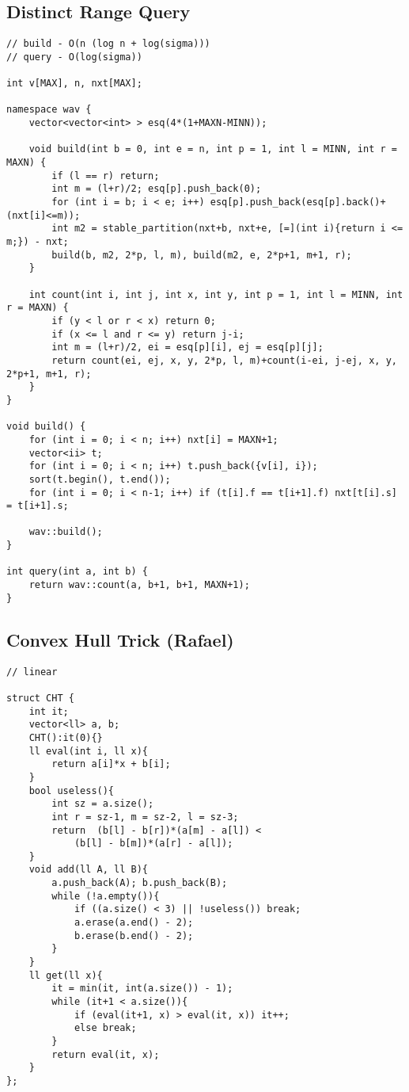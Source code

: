 \documentclass[12pt, a4paper, twoside]{article}
\begin{document}
\subsection{Distinct Range Query}
\begin{lstlisting}
// build - O(n (log n + log(sigma)))
// query - O(log(sigma))

int v[MAX], n, nxt[MAX];

namespace wav {
	vector<vector<int> > esq(4*(1+MAXN-MINN));

	void build(int b = 0, int e = n, int p = 1, int l = MINN, int r = MAXN) {
		if (l == r) return;
		int m = (l+r)/2; esq[p].push_back(0);
		for (int i = b; i < e; i++) esq[p].push_back(esq[p].back()+(nxt[i]<=m));
		int m2 = stable_partition(nxt+b, nxt+e, [=](int i){return i <= m;}) - nxt;
		build(b, m2, 2*p, l, m), build(m2, e, 2*p+1, m+1, r);
	}

	int count(int i, int j, int x, int y, int p = 1, int l = MINN, int r = MAXN) {
		if (y < l or r < x) return 0;
		if (x <= l and r <= y) return j-i;
		int m = (l+r)/2, ei = esq[p][i], ej = esq[p][j];
		return count(ei, ej, x, y, 2*p, l, m)+count(i-ei, j-ej, x, y, 2*p+1, m+1, r);
	}
}

void build() {
	for (int i = 0; i < n; i++) nxt[i] = MAXN+1;
	vector<ii> t;
	for (int i = 0; i < n; i++) t.push_back({v[i], i});
	sort(t.begin(), t.end());
	for (int i = 0; i < n-1; i++) if (t[i].f == t[i+1].f) nxt[t[i].s] = t[i+1].s;

	wav::build();
}

int query(int a, int b) {
	return wav::count(a, b+1, b+1, MAXN+1);
}
\end{lstlisting}

\subsection{Convex Hull Trick (Rafael)}
\begin{lstlisting}
// linear

struct CHT {
	int it;
	vector<ll> a, b;
	CHT():it(0){}
	ll eval(int i, ll x){
		return a[i]*x + b[i];
	}
	bool useless(){
		int sz = a.size();
		int r = sz-1, m = sz-2, l = sz-3;
		return	(b[l] - b[r])*(a[m] - a[l]) <
			(b[l] - b[m])*(a[r] - a[l]);
	}
	void add(ll A, ll B){
		a.push_back(A); b.push_back(B);
		while (!a.empty()){
			if ((a.size() < 3) || !useless()) break;
			a.erase(a.end() - 2);
			b.erase(b.end() - 2);
		}
	}
	ll get(ll x){
		it = min(it, int(a.size()) - 1);
		while (it+1 < a.size()){
			if (eval(it+1, x) > eval(it, x)) it++;
			else break;
		}
		return eval(it, x);
	}
};
\end{lstlisting}
\end{document}
